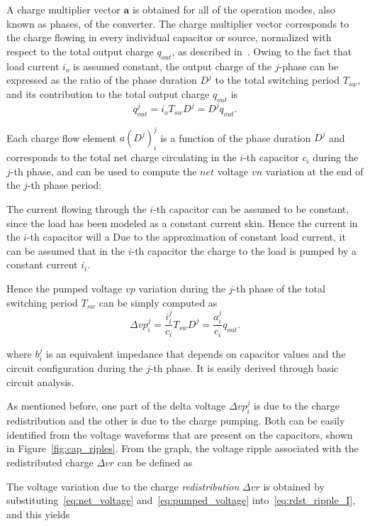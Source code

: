 A charge multiplier vector $\mathbf{a}$ is obtained for all of the operation modes, also known as phases, of the converter. The charge multiplier vector corresponds to the charge flowing in every individual capacitor or source, normalized with respect to the total output charge $q_{out}$, as described in~\cite{95Makowski,Seeman:EECS-2009-78}. Owing to the fact that load current $i_o$ is assumed constant, the output charge of the $j$-phase can be expressed as the ratio of the phase duration $D^j$ to the total switching period $T_{sw}$, and its contribution to the total output charge $q_{out}$ is
\begin{equation}
    q^j_{out} = i_{o} T_{sw} D^j = D^j q_{out} .
\label{eq:qout}
\end{equation}

Each charge flow element $ a(D^j)_i^j$  is a function of the phase duration $D^j$ and corresponds to the total net charge circulating in the $i$-th capacitor $c_i$ during the $j$-th phase, and can be used to compute the $net$ voltage $vn$ variation at the end of the $j$-th phase period:

The current flowing through the $i$-th capacitor can be assumed to be constant, since the load has been modeled as a constant current skin. Hence the current in the $i$-th capacitor will a
Due to the approximation of constant load current, it can be assumed that in the $i$-th capacitor the charge to the load is pumped by a constant current $i_i$.

Hence the pumped voltage $vp$ variation during the $j$-th phase of the total switching period $T_{sw}$ can be simply computed as
\begin{equation}
\Delta {vp}^j_i  = \frac{i_i^j}{c_i} T_{sw} D^j = \frac{a_i ^j }{c_i} q_{out} .
\label{eq:pumped_voltage}
\end{equation}

where $b_i^j$ is an equivalent impedance that depends on capacitor values and the circuit configuration during the $j$-th phase. It is easily derived through basic circuit analysis.

As mentioned before, one part of the delta voltage $\Delta vp_i^j$ is due to the charge redistribution and the other is due to the charge pumping. Both can be easily identified from the voltage waveforms that are present on the capacitors, shown in Figure~\ref{fig:cap_riples}. From the graph, the voltage ripple associated with the redistributed charge $\Delta vr$ can be defined as

The voltage variation due to the charge \emph{redistribution} $\Delta vr$  is obtained by substituting~\ref{eq:net_voltage} and~\ref{eq:pumped_voltage} into~\ref{eq:rdst_ripple_I}, and this yields


